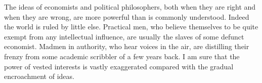 The ideas of economists and political philosophers, both when
they are right and when they are wrong, are more powerful than
is commonly understood. Indeed the world is ruled by little else.
Practical men, who believe themselves to be quite exempt from
any intellectual influence, are usually the slaves of some defunct
economist. Madmen in authority, who hear voices in the air,
are distilling their frenzy from some academic scribbler of a few
years back. I am sure that the power of vested interests is vastly
exaggerated compared with the gradual encroachment of ideas. 
\cite{keynes1934}
\cite{mazzucato2011entrepreneurial}
